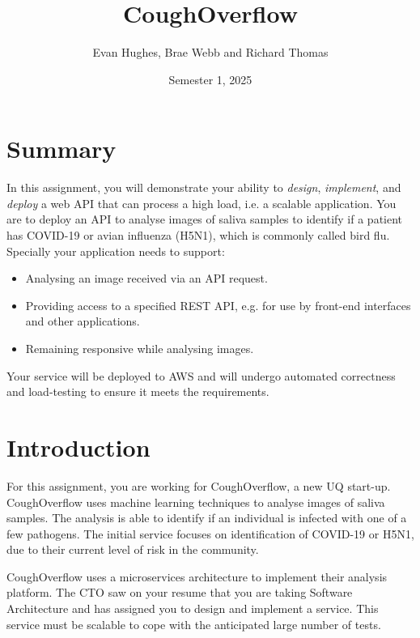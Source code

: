 \documentclass{csse4400}
\title{CoughOverflow}
\author{Evan Hughes, Brae Webb and Richard Thomas}
\date{Semester 1, 2025}
\begin{document}

\maketitle


\section*{Summary}
In this assignment, you will demonstrate your ability to \textit{design},
\textit{implement}, and \textit{deploy} a web API that can process a high load,
i.e. a scalable application.
You are to deploy an API to analyse images of saliva samples to identify if a patient has COVID-19
or avian influenza (H5N1), which is commonly called bird flu.
Specially your application needs to support:
\begin{itemize}
    \item Analysing an image received via an API request.
    \item Providing access to a specified REST API, e.g. for use by front-end interfaces and other applications.
    \item Remaining responsive while analysing images.
\end{itemize}

\noindent
Your service will be deployed to AWS and will undergo automated correctness and load-testing to ensure it meets the requirements.


\section{Introduction}

For this assignment, you are working for CoughOverflow, a new UQ start-up.
CoughOverflow uses machine learning techniques to analyse images of saliva samples.
The analysis is able to identify if an individual is infected with one of a few pathogens.
The initial service focuses on identification of COVID-19 or H5N1,
due to their current level of risk in the community.

CoughOverflow uses a microservices architecture to implement their analysis platform.
The CTO saw on your resume that you are taking Software Architecture and has assigned you to design and implement a service.
This service must be scalable to cope with the anticipated large number of tests.
\end{document}
